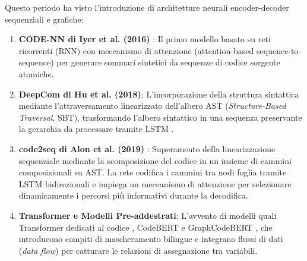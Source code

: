 Questo periodo ha visto l'introduzione di architetture neurali encoder-decoder sequenziali e grafiche:
\begin{enumerate}
    \item \textbf{CODE-NN di Iyer et al. (2016)} \cite{iyer_summarizing_2016}: Il primo modello basato su reti ricorrenti (RNN) con meccanismo di attenzione (attention-based sequence-to-sequence) per generare sommari sintetici da sequenze di codice sorgente atomiche.
    \item \textbf{DeepCom di Hu et al. (2018)}: L'incorporazione della struttura sintattica mediante l'attraversamento linearizzato dell'albero AST (\emph{Structure-Based Traversal}, SBT), trasformando l'albero sintattico in una sequenza preservante la gerarchia da processare tramite LSTM \cite{zhang_survey_2022}.
    \item \textbf{code2seq di Alon et al. (2019)} \cite{alon_code2seq_2019}: Superamento della linearizzazione sequenziale mediante la scomposizione del codice in un insieme di cammini composizionali su AST. La rete codifica i cammini tra nodi foglia tramite LSTM bidirezionali e impiega un meccanismo di attenzione per selezionare dinamicamente i percorsi più informativi durante la decodifica.
    \item \textbf{Transformer e Modelli Pre-addestrati}: L'avvento di modelli quali Transformer dedicati al codice \cite{ahmad_transformer-based_2020}, CodeBERT \cite{feng_codebert_2020} e GraphCodeBERT \cite{guo_graphcodebert_2021}, che introducono compiti di mascheramento bilingue e integrano flussi di dati (\emph{data flow}) per catturare le relazioni di assegnazione tra variabili.
\end{enumerate}

